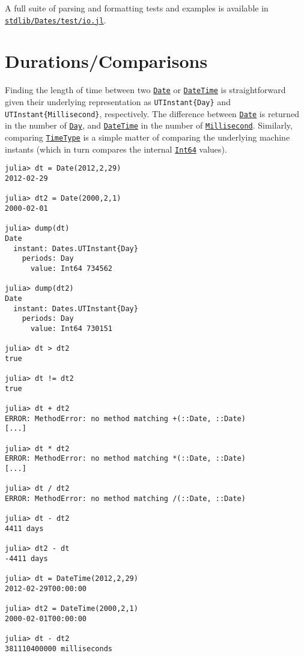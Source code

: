 A full suite of parsing and formatting tests and examples is available in \href{https://github.com/JuliaLang/julia/blob/master/stdlib/Dates/test/io.jl}{\texttt{stdlib/Dates/test/io.jl}}.



\hypertarget{9675062304126123157}{}


\section{Durations/Comparisons}



Finding the length of time between two \hyperlink{4488183467971164548}{\texttt{Date}} or \hyperlink{17572689933274889838}{\texttt{DateTime}} is straightforward given their underlying representation as \texttt{UTInstant\{Day\}} and \texttt{UTInstant\{Millisecond\}}, respectively. The difference between \hyperlink{4488183467971164548}{\texttt{Date}} is returned in the number of \hyperlink{13217464551942182596}{\texttt{Day}}, and \hyperlink{17572689933274889838}{\texttt{DateTime}} in the number of \hyperlink{9366634148855607364}{\texttt{Millisecond}}. Similarly, comparing \hyperlink{4438614350756187528}{\texttt{TimeType}} is a simple matter of comparing the underlying machine instants (which in turn compares the internal \hyperlink{7720564657383125058}{\texttt{Int64}} values).




\begin{verbatim}
julia> dt = Date(2012,2,29)
2012-02-29

julia> dt2 = Date(2000,2,1)
2000-02-01

julia> dump(dt)
Date
  instant: Dates.UTInstant{Day}
    periods: Day
      value: Int64 734562

julia> dump(dt2)
Date
  instant: Dates.UTInstant{Day}
    periods: Day
      value: Int64 730151

julia> dt > dt2
true

julia> dt != dt2
true

julia> dt + dt2
ERROR: MethodError: no method matching +(::Date, ::Date)
[...]

julia> dt * dt2
ERROR: MethodError: no method matching *(::Date, ::Date)
[...]

julia> dt / dt2
ERROR: MethodError: no method matching /(::Date, ::Date)

julia> dt - dt2
4411 days

julia> dt2 - dt
-4411 days

julia> dt = DateTime(2012,2,29)
2012-02-29T00:00:00

julia> dt2 = DateTime(2000,2,1)
2000-02-01T00:00:00

julia> dt - dt2
381110400000 milliseconds
\end{verbatim}



